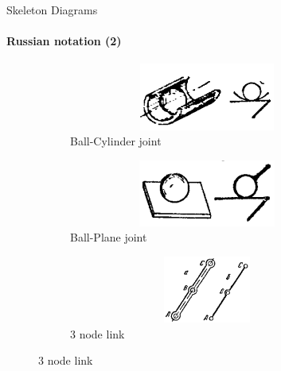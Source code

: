 \documentclass[aspectratio=169]{beamer}
\begin{document}
\begin{frame}[t]{Skeleton Diagrams}
\framesubtitle{Russian notation (2)}
\vspace{-0.5cm}
\begin{figure}[H]
\begin{subfigure}{0.32\textwidth}
    \centering\includegraphics[height=2.2cm,width=1\textwidth,keepaspectratio]{B_C_sd.png}
    \caption*{Ball-Cylinder joint}
\end{subfigure}
\begin{subfigure}{0.32\textwidth}
    \centering\includegraphics[height=2.2cm,width=1\textwidth,keepaspectratio]{B_F_sd.png}
    \caption*{Ball-Plane joint}
\end{subfigure}
\begin{subfigure}{0.32\textwidth}
    \centering\includegraphics[height=2.2cm,width=1\textwidth,keepaspectratio]{3l_sd.png}
    \caption*{3 node link}
\end{subfigure}



\end{figure}
\end{frame}
\end{document}
